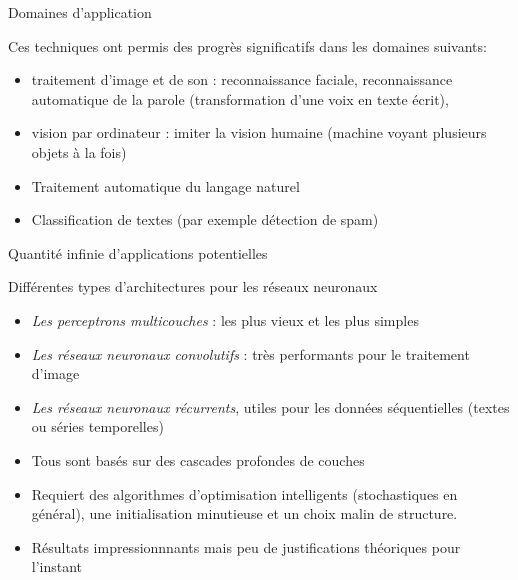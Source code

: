 \documentclass[ignorenonframetext,]{beamer}
\providecommand{\tightlist}{%
  \setlength{\itemsep}{0pt}\setlength{\parskip}{0pt}}
\begin{document}
\begin{frame}{Domaines d'application}

Ces techniques ont permis des progrès significatifs dans les domaines
suivants:

\begin{itemize}
\tightlist
\item
  traitement d'image et de son : reconnaissance faciale, reconnaissance
  automatique de la parole (transformation d'une voix en texte écrit),
\item
  vision par ordinateur : imiter la vision humaine (machine voyant
  plusieurs objets à la fois)
\item
  Traitement automatique du langage naturel
\item
  Classification de textes (par exemple détection de spam)
\end{itemize}

Quantité infinie d'applications potentielles

\end{frame}

\begin{frame}{Différentes types d'architectures pour les réseaux
neuronaux}

\begin{itemize}
\item
  \emph{Les perceptrons multicouches} : les plus vieux et les plus
  simples
\item
  \emph{Les réseaux neuronaux convolutifs} : très performants pour le
  traitement d'image
\item
  \emph{Les réseaux neuronaux récurrents}, utiles pour les données
  séquentielles (textes ou séries temporelles)
\item
  Tous sont basés sur des cascades profondes de couches
\item
  Requiert des algorithmes d'optimisation intelligents (stochastiques en
  général), une initialisation minutieuse et un choix malin de
  structure.
\item
  Résultats impressionnnants mais peu de justifications théoriques pour
  l'instant
\end{itemize}

\end{frame}
\end{document}
